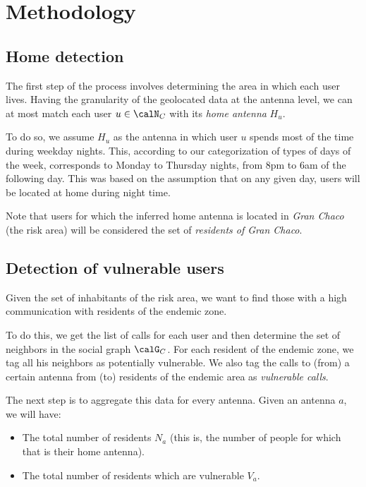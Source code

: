 
\section{Methodology} \label{methods}

\subsection{Home detection}

    The first step of the process involves determining the area in which each user lives. Having the granularity of the geolocated data at the antenna level, we can at most match each user $u \in \calN_C$ with its \textit{home antenna} $H_u$.

    To do so, we assume $H_u$ as the antenna in which user $u$ spends most of the time during weekday nights. This, according to our categorization of types of days of the week, corresponds to Monday to Thursday nights, from 8pm to 6am of the following day. This was based on the assumption that on any given day, users will be located at home during night time.
    
    Note that users for which the inferred home antenna is located in \textit{Gran Chaco} (the risk area) will be considered the set of \textit{residents of Gran Chaco}.

\subsection{Detection of vulnerable users}
    Given the set of inhabitants of the risk area, we want to find those with a high communication with residents of the endemic zone.
    
    To do this, we get the list of calls for each user and then determine the set of neighbors in the social graph $\calG_C$. For each resident of the endemic zone, we tag all his neighbors as potentially vulnerable. We also tag the calls to (from) a certain antenna from (to) residents of the endemic area as \textit{vulnerable calls}.
    
    The next step is to aggregate this data for every antenna. Given an antenna $a$, we will have:
    \begin{itemize}
        \item The total number of residents $N_a$ (this is, the number of people for which that is their home antenna).
        \item The total number of residents which are vulnerable $V_a$.
    \end{itemize}
    
